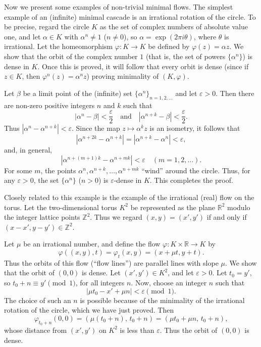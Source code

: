 Now we present some examples of non-trivial minimal flows. The simplest example of an (infinite) minimal cascade is an irrational rotation of the circle. To be precise, regard the circle $K$ as the set of complex numbers of absolute value one, and let $\alpha \in K$ with $\alpha^n \neq 1$ ($n \neq 0$), so $\alpha = \exp(2\pi i \theta)$, where $\theta$ is irrational. Let the homeomorphism $\varphi : K \to K$ be defined by $\varphi(z) = \alpha z$. We show that the orbit of the complex number $1$ (that is, the set of powers $\{\alpha^n\}$) is dense in $K$. Once this is proved, it will follow that every orbit is dense (since if $z \in K$, then $\varphi^n(z) = \alpha^n z$) proving minimality of $(K,\varphi)$.

Let $\beta$ be a limit point of the (infinite) set $\{\alpha^n\}_{n=1,2,\ldots}$ and let $\varepsilon > 0$. Then there are non-zero positive integers $n$ and $k$ such that
\[
    |\alpha^n - \beta| < \frac{\varepsilon}{2} \quad \text{and} \quad |\alpha^{n+k} - \beta| < \frac{\varepsilon}{2}.
\]
Thus $|\alpha^n - \alpha^{n+k}| < \varepsilon$. Since the map $z \mapsto \alpha^k z$ is an isometry, it follows that
\[
    |\alpha^{n+2k} - \alpha^{n+k}| = |\alpha^{n+k} - \alpha^n| < \varepsilon,
\]
and, in general,
\[
    |\alpha^{n+(m+1)k} - \alpha^{n+mk}| < \varepsilon \quad (m = 1,2,\ldots).
\]
For some $m$, the points $\alpha^n, \alpha^{n+k}, \ldots, \alpha^{n+mk}$ “wind” around the circle. Thus, for any $\varepsilon > 0$, the set $\{\alpha^n\}$ ($n > 0$) is $\varepsilon$-dense in $K$. This completes the proof.


Closely related to this example is the example of the irrational (real) flow on the torus. Let the two-dimensional torus $K^2$ be represented as the plane $\mathbb{R}^2$ modulo the integer lattice points $\mathbb{Z}^2$. Thus we regard $(x,y) = (x',y')$ if and only if $(x - x', y - y') \in \mathbb{Z}^2$.

Let $\mu$ be an irrational number, and define the flow $\varphi : K \times \mathbb{R} \to K$ by
\[
    \varphi((x,y),t) = \varphi_t(x,y) = (x + \mu t, y + t).
\]
Thus the orbits of this flow (“flow lines”) are parallel lines with slope $\mu$. We show that the orbit of $(0,0)$ is dense. Let $(x',y') \in K^2$, and let $\varepsilon > 0$. Let $t_0 = y'$, so $t_0 + n \equiv y' \pmod{1}$, for all integers $n$. Now, choose an integer $n$ such that
\[
    |\mu t_0 - x' + \mu n| < \varepsilon \pmod{1}.
\]
The choice of such an $n$ is possible because of the minimality of the irrational rotation of the circle, which we have just proved. Then
\[
    \varphi_{t_0 + n}(0,0) = (\mu (t_0 + n),\, t_0 + n) = (\mu t_0 + \mu n,\, t_0 + n),
\]
whose distance from $(x',y')$ on $K^2$ is less than $\varepsilon$. Thus the orbit of $(0,0)$ is dense.


